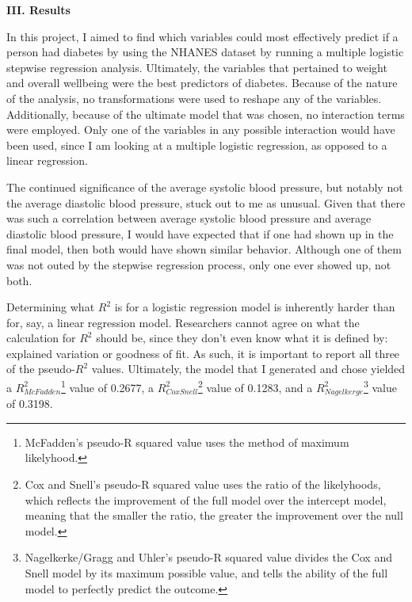 \documentclass[letter,12pt]{article}
\begin{document}
	\begin{center}
		\textbf{III. Results}\par
	\end{center}
	\justify
	In this project, I aimed to find which variables could most effectively predict if a person had diabetes by using the NHANES dataset by running a multiple logistic stepwise regression analysis. Ultimately, the variables that pertained to weight and overall wellbeing were the best predictors of diabetes. Because of the nature of the analysis, no transformations were used to reshape any of the variables. Additionally, because of the ultimate model that was chosen, no interaction terms were employed. Only one of the variables in any possible interaction would have been used, since I am looking at a multiple logistic regression, as opposed to a linear regression.\par
	The continued significance of the average systolic blood pressure, but notably not the average diastolic blood pressure, stuck out to me as unusual. Given that there was such a correlation between average systolic blood pressure and average diastolic blood pressure, I would have expected that if one had shown up in the final model, then both would have shown similar behavior. Although one of them was not outed by the stepwise regression process, only one ever showed up, not both.\par
	Determining what $R^{2}$ is for a logistic regression model is inherently harder than for, say, a linear regression model. Researchers cannot agree on what the calculation for $R^{2}$ should be, since they don't even know what it is defined by: explained variation or goodness of fit. As such, it is important to report all three of the pseudo-$R^{2}$ values. Ultimately, the model that I generated and chose yielded a $R^{2}_{McFadden}$\footnote{McFadden's pseudo-R squared value uses the method of maximum likelyhood.} value of 0.2677, a $R^{2}_{CoxSnell}$\footnote{Cox and Snell's pseudo-R squared value uses the ratio of the likelyhoods, which reflects the improvement of the full model over the intercept model, meaning that the smaller the ratio, the greater the improvement over the null model.} value of 0.1283, and a $R^{2}_{Nagelkerge}$\footnote{Nagelkerke/Gragg and Uhler's pseudo-R squared value divides the Cox and Snell model by its maximum possible value, and tells the ability of the full model to perfectly predict the outcome.} value of 0.3198.
	
\end{document}
